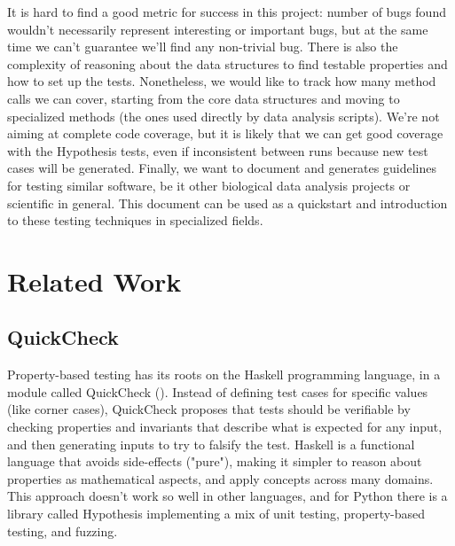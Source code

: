 \documentclass[preprint,nocopyrightspace]{sig-alternate}
\begin{document}
It is hard to find a good metric for success in this project:
number of bugs found wouldn't necessarily represent interesting or important bugs,
but at the same time we can't guarantee we'll find any non-trivial bug.
There is also the complexity of reasoning about the data structures to find testable properties and how to set up the tests.
Nonetheless,
we would like to track how many method calls we can cover,
starting from the core data structures and moving to specialized methods (the ones used directly by data analysis scripts).
We're not aiming at complete code coverage,
but it is likely that we can get good coverage with the Hypothesis tests,
even if inconsistent between runs because new test cases will be generated.
Finally,
we want to document and generates guidelines for testing similar software,
be it other biological data analysis projects or scientific in general.
This document can be used as a quickstart and introduction to these testing techniques in specialized fields.

\section{Related Work}

\subsection{QuickCheck}
Property-based testing has its roots on the Haskell programming language,
in a module called QuickCheck (\citet{claessen_quickcheck:_2011}).
Instead of defining test cases for specific values (like corner cases),
QuickCheck proposes that tests should be verifiable by checking properties and invariants that describe what is expected for any input,
and then generating inputs to try to falsify the test.
Haskell is a functional language that avoids side-effects ("pure"),
making it simpler to reason about properties as mathematical aspects,
and apply concepts across many domains.
This approach doesn't work so well in other languages,
and for Python there is a library called Hypothesis implementing a mix of unit testing,
property-based testing,
and fuzzing.
\end{document}

